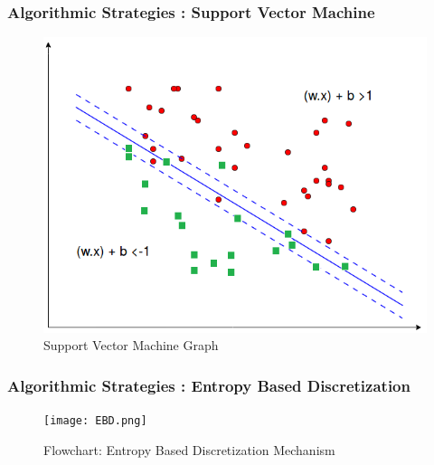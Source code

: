 \documentclass[10pt]{beamer}
\begin{document}
\begin{frame}
\frametitle{Algorithmic Strategies : Support Vector Machine}
\begin{figure}
\includegraphics[scale=0.5]{Support_Vector_Machine.png}
\caption{\footnotesize Support Vector Machine Graph}
\end{figure}
\end{frame}



\begin{frame}
\frametitle{Algorithmic Strategies : Entropy Based Discretization}
\begin{figure}
\texttt{[image: EBD.png]}
\caption{\footnotesize Flowchart: Entropy Based Discretization Mechanism}
\end{figure}
\end{frame}
\end{document}
